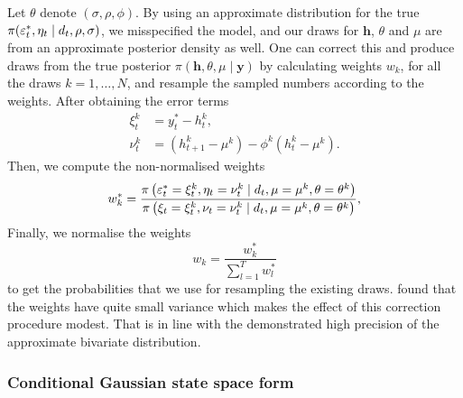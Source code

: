 Let $\theta$ denote $(\sigma,\rho,\phi)$.
By using an approximate distribution for the true $\pi(\varepsilon_t^\ast,\eta_t\mid d_t,\rho,\sigma)$, we misspecified the model, and our draws for $\bm{h}$, $\theta$ and $\mu$ are from an approximate posterior density as well.
One can correct this and produce draws from the true posterior $\pi(\bm{h},\theta,\mu\mid\bm{y})$ by calculating weights $w_k$, for all the draws $k=1,\dots,N$, and resample the sampled numbers according to the weights.
After obtaining the error terms
\begin{align*}
\xi_t^k &= y_t^\ast-h_t^k, \\
\nu_t^k &= (h_{t+1}^k-\mu^k)-\phi^k(h_t^k-\mu^k).
\end{align*}
Then, we compute the non-normalised weights
\begin{equation*}
w_k^\ast=\frac{\pi\left(\varepsilon_t^\ast=\xi_t^k,\eta_t=\nu_t^k\mid d_t,\mu=\mu^k,\theta=\theta^k\right)}{\pi\left(\xi_t=\xi_t^k,\nu_t=\nu_t^k\mid d_t,\mu=\mu^k,\theta=\theta^k\right)},
\end{equation*}
Finally, we normalise the weights
\begin{equation*}
w_k=\frac{w_k^\ast}{\sum_{l=1}^{T}w_l^\ast}
\end{equation*}
to get the probabilities that we use for resampling the existing draws.
\citeauthor{Omori2007} found that the weights have quite small variance which makes the effect of this correction procedure modest.
That is in line with the demonstrated high precision of the approximate bivariate distribution.

\subsubsection[State space form]{Conditional Gaussian state space form}

